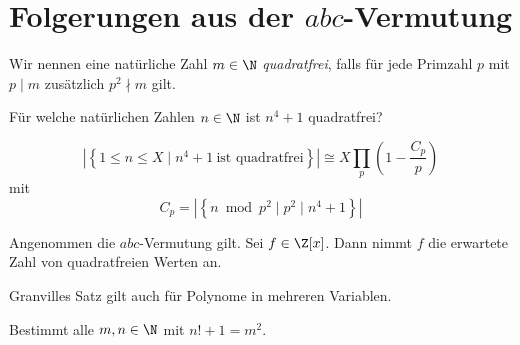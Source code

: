 \section{Folgerungen aus der $abc$-Vermutung}


\begin{defn*}
	Wir nennen eine natürliche Zahl $m \in \N$ \emph{quadratfrei}, falls für jede Primzahl $p$ mit $p \mid m$ zusätzlich $p^2 \nmid m$ gilt.
\end{defn*}

\begin{frage*}
	Für welche natürlichen Zahlen $n \in \N$ ist $ n^4+1 $ quadratfrei?
\end{frage*}

\begin{conj*}
	\[ \left| \left\{ 1 \leq n \leq X \mid n^4+1 \ \text{ist quadratfrei} \right\} \right| \cong X \prod_p \left( 1-\frac{C_p}{p} \right) \]
	mit 
	\[ C_p = \left| \left\{ n \bmod p^2 \mid p^2 \mid n^4+1 \right\} \right| \]
\end{conj*}

\begin{thm*}[Granville, 1998]
	Angenommen die $abc$-Vermutung gilt. Sei $f \in \Z[x]$. Dann nimmt $f$ die erwartete Zahl von quadratfreien Werten an.
\end{thm*}

\begin{thm*}
	Granvilles Satz gilt auch für Polynome in mehreren Variablen.
\end{thm*}

\begin{frage*}
	Bestimmt alle $m,n \in \N$ mit $n!+1=m^2$.
\end{frage*}

